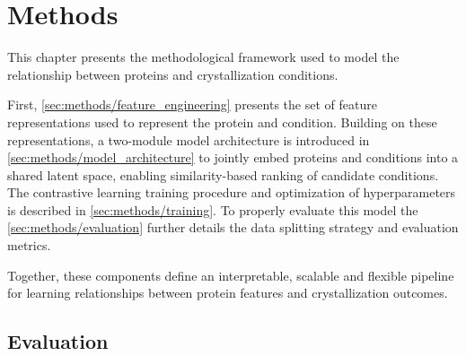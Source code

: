 \chapter{Methods}\label{methods}
This chapter presents the methodological framework used to model the relationship between proteins and crystallization conditions. 

First, \autoref{sec:methods/feature_engineering} presents the set of feature representations used to represent the protein and condition. 
Building on these representations, a two-module model architecture is introduced in \autoref{sec:methods/model_architecture} to jointly embed proteins and conditions into a shared latent space, enabling similarity-based ranking of candidate conditions. The contrastive learning training procedure and optimization of hyperparameters is described in \autoref{sec:methods/training}. To properly evaluate this model the \autoref{sec:methods/evaluation} further details the data splitting strategy and evaluation metrics.

Together, these components define an interpretable, scalable and flexible pipeline for learning relationships between protein features and crystallization outcomes.







\section{Evaluation}\label{sec:methods/evaluation}


